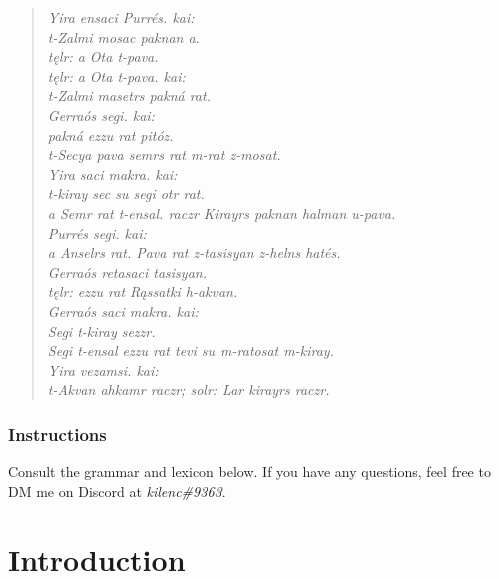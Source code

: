 \documentclass[fontsize=12pt,twoside=false,numbers=noenddot]{class/kaobook}
\newcommand{\rzc}{\color[HTML]{5B2D90}}
\newcommand{\tin}{\-\hspace{1cm}}
\renewcommand{\it}{\itshape}
\begin{document}
\begin{minipage}{164.6mm}
\begin{quote} \rzc\it
Yira ensaci Purrés. kai: \\
\tin t-Zalmi mosac paknan a. \\
\tin tęlr: a Ota t-pava. \\

\tin tęlr: a Ota t-pava. kai: \\
\tin t-Zalmi masetrs pakná rat. \\
Gerraós segi. kai: \\
\tin pakná ezzu rat pitóz. \\
\tin t-Secya pava semrs rat m-rat z-mosat. \\

Yira saci makra. kai: \\
\tin t-kiray sec su segi otr rat. \\
\tin a Semr rat t-ensal. raczr Kirayrs paknan halman u-pava. \\

Purrés segi. kai: \\
\tin a Anselrs rat. Pava rat z-tasisyan z-helns hatés. \\
\tin Gerraós retasaci tasisyan. \\
\tin tęlr: ezzu rat Rąssatki h-akvan. \\

Gerraós saci makra. kai: \\
\tin Segi t-kiray sezzr. \\
\tin Segi t-ensal ezzu rat tevi su m-ratosat m-kiray. \\

Yira vezamsi. kai: \\
\tin t-Akvan ahkamr raczr; solr: Lar kirayrs raczr. \\
\end{quote}
\end{minipage}

\section{Instructions}
Consult the grammar and lexicon below. If you have any questions, feel free to DM me on Discord at \emph{kilenc\#9363}.

\part{Introduction}
\end{document}
